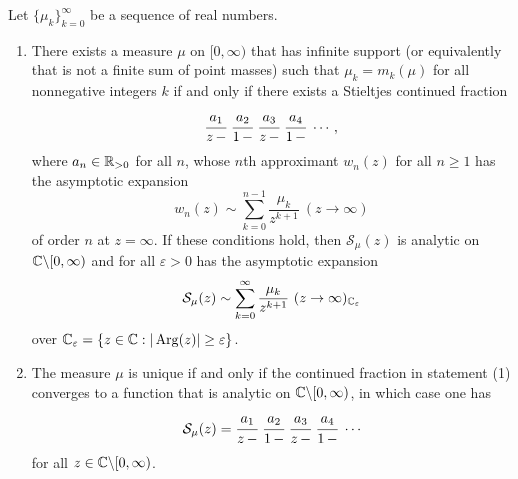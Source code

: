 \documentclass[12pt]{article}
\begin{document}
\begin{theorem}\label{mutheorem1}
Let $\{\mu_k\}_{k = 0}^\infty$ be a sequence of real numbers. 
\begin{enumerate}
\item There exists a measure $\mu$ on $[0,\infty)$ that has infinite support (or equivalently that is not a finite sum of point masses) such that $\mu_k = m_k(\mu)$ for all nonnegative integers $k$ if and only if there exists a Stieltjes continued fraction
\begin{align*}
\cfrac{a_1} {z \, -} \ \cfrac{a_2} {1 \, -}  \ \cfrac{a_3} {z \, -} \ \cfrac{a_4} {1 \, -} \  \cdots,
\end{align*}
where $a_n \in {\mathbb R}_{> 0}$ for all $n$, whose $n$th approximant $w_n(z)$ for all $n \geq 1$  has the asymptotic expansion
$$w_n(z) \sim  \sum_{k = 0}^{n-1} \frac{\mu_k}{z^{k+1}}  \ (z \to \infty)$$ 
of order $n$ at $z = \infty$.  If these conditions hold, then
${\mathcal S}_\mu(z)$ is analytic on ${\mathbb C}\backslash [0,\infty)$ and for all $\varepsilon > 0$ has the asymptotic expansion
$${\mathcal S}_\mu(z) \sim \sum_{k = 0}^\infty \frac{\mu_k}{z^{k+1}} \ (z \to \infty)_{{\mathbb C}_\varepsilon}$$
over  ${{\mathbb C}_\varepsilon} = \{z \in {\mathbb C}: |\operatorname{Arg}(z)| \geq \varepsilon\}$.
\item The measure $\mu$ is unique if and only if the continued fraction in statement (1) converges to a function that is analytic on ${\mathbb C}\backslash [0,\infty)$, in which case one has
\begin{align*}
{\mathcal S}_\mu(z) = \cfrac{a_1} {z \, -} \ \cfrac{a_2} {1 \, -}  \ \cfrac{a_3} {z \, -} \ \cfrac{a_4} {1 \, -}  \  \cdots
\end{align*}
for all $z \in {\mathbb C}\backslash [0,\infty)$.
\end{enumerate}
\end{theorem}

\end{document}
